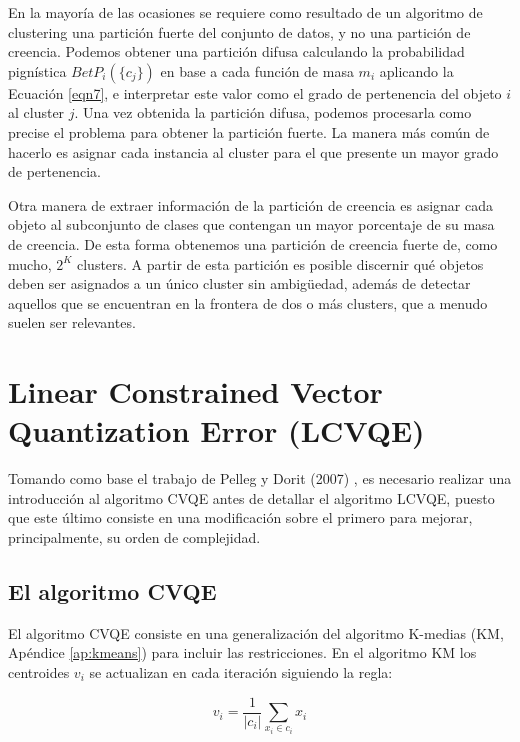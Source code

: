 En la mayoría de las ocasiones se requiere como resultado de un algoritmo de clustering una partición fuerte del conjunto de datos, y no una partición de creencia. Podemos obtener una partición difusa calculando la probabilidad pignística $BetP_i(\{c_j\})$ en base a cada función de masa $m_i$ aplicando la Ecuación \ref{eqn7}, e interpretar este valor como el grado de pertenencia del objeto $i$ al cluster $j$. Una vez obtenida la partición difusa, podemos procesarla como precise el problema para obtener la partición fuerte. La manera más común de hacerlo es asignar cada instancia al cluster para el que presente un mayor grado de pertenencia.

Otra manera de extraer información de la partición de creencia es asignar cada objeto al subconjunto de clases que contengan un mayor porcentaje de su masa de creencia. De esta forma obtenemos una partición de creencia fuerte de, como mucho, $2^K$ clusters. A partir de esta partición es posible discernir qué objetos deben ser asignados a un único cluster sin ambigüedad, además de detectar aquellos que se encuentran en la frontera de dos o más clusters, que a menudo suelen ser relevantes.

\clearpage

\section{Linear Constrained Vector Quantization Error (LCVQE)} \label{lcvqe}

Tomando como base el trabajo de Pelleg y Dorit (2007) \cite{LCVQE:2007}, es necesario realizar una introducción al algoritmo \acf{CVQE} antes de detallar el algoritmo \acs{LCVQE}, puesto que este último consiste en una modificación sobre el primero para mejorar, principalmente, su orden de complejidad.

\subsection{El algoritmo CVQE}

El algoritmo \acs{CVQE} consiste en una generalización del algoritmo K-medias (\acs{KM}, Apéndice \ref{ap:kmeans}) para incluir las restricciones. En el algoritmo \acs{KM} los centroides $v_i$ se actualizan en cada iteración siguiendo la regla:

\begin{equation}
v_i = \frac{1}{|c_i|} \sum_{x_i \in c_i} x_i
\label{eqn27}
\end{equation}

